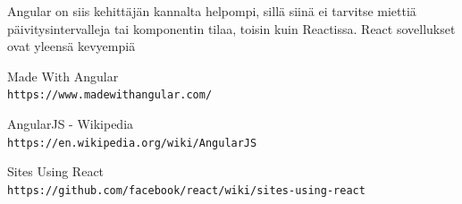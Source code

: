\documentclass[a4paper,12pt,twoside]{article} %
\begin{document}
\vspace{4mm}\noindent
Angular on siis kehittäjän kannalta helpompi, sillä siinä ei tarvitse miettiä päivitysintervalleja tai komponentin tilaa, toisin kuin Reactissa. React sovellukset ovat yleensä kevyempiä 


\newpage

\newpage
\setcounter{secnumdepth}{0}

\begin{thebibliography}{9}

Made With Angular
\\\texttt{https://www.madewithangular.com/}

AngularJS - Wikipedia
\\\texttt{https://en.wikipedia.org/wiki/AngularJS}

Sites Using React
\\\texttt{https://github.com/facebook/react/wiki/sites-using-react}

\end{thebibliography}
\end{document}
